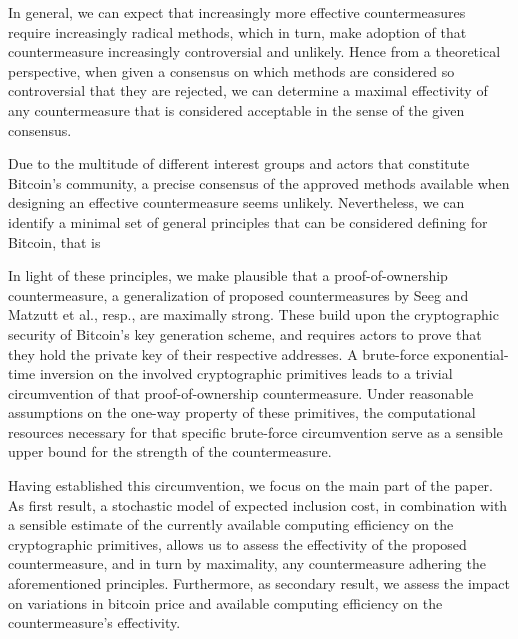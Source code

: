 \documentclass[a4paper,11pt,titlepage]{scrbook}
\begin{document}
In general, we can expect that increasingly more effective countermeasures require increasingly radical methods, which in turn, make adoption of that countermeasure increasingly controversial and unlikely.
Hence from a theoretical perspective, when given a consensus on which methods are considered so controversial that they are rejected, we can determine a maximal effectivity of any countermeasure that is considered acceptable in the sense of the given consensus.

Due to the multitude of different interest groups and actors that constitute Bitcoin's community, a precise consensus of the approved methods available when designing an effective countermeasure seems unlikely.
Nevertheless, we can identify a minimal set of general principles that can be considered defining for Bitcoin,
that is 

In light of these principles, we make plausible that a proof-of-ownership countermeasure, a generalization of proposed countermeasures by Seeg and Matzutt et al.\@, resp., are maximally strong. 
These build upon the cryptographic security of Bitcoin's key generation scheme, and requires actors to prove that they hold the private key of their respective addresses.
A brute-force exponential-time inversion on the involved cryptographic primitives leads to a trivial circumvention of that proof-of-ownership countermeasure.
Under reasonable assumptions on the one-way property of these primitives,
the computational resources necessary for that specific brute-force circumvention serve as a sensible upper bound for the strength of the countermeasure.

Having established this circumvention, we focus on the main part of the paper.
As first result, a stochastic model of expected inclusion cost, in combination with a sensible estimate of the currently available computing efficiency on the cryptographic primitives, allows us to assess the effectivity of the proposed countermeasure, and in turn by maximality, any countermeasure adhering the aforementioned principles.
Furthermore, as secondary result, we assess the impact on variations in bitcoin price and available computing efficiency on the countermeasure's effectivity.
\end{document}
